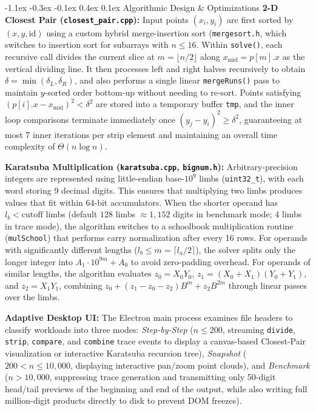 \documentclass[10pt,twocolumn]{article}
\makeatletter
\renewcommand\subsection{\@startsection{subsection}{2}{\z@}%
  {-1.1ex \@plus -0.3ex \@minus -0.1ex}%
  {0.4ex \@plus 0.1ex}%
  {\normalfont\small\bfseries}}
\makeatother
\begin{document}
\subsection{Algorithmic Design \& Optimizations}
\textbf{2-D Closest Pair (\texttt{closest\_pair.cpp}):} Input points $(x_i, y_i)$ are first sorted by $(x, y, \text{id})$ using a custom hybrid merge-insertion sort (\texttt{mergesort.h}, which switches to insertion sort for subarrays with $n \le 16$. Within \texttt{solve()}, each recursive call divides the current slice at $m = \lfloor n/2 \rfloor$ along $x_{\text{mid}} = p[m].x$ as the vertical dividing line. It then processes left and right halves recursively to obtain $\delta = \min(\delta_L, \delta_R)$, and also performs a single linear \texttt{mergeRuns()} pass to maintain $y$-sorted order bottom-up without needing to re-sort. Points satisfying $(p[i].x - x_{\text{mid}})^2 < \delta^2$ are stored into a temporary buffer \texttt{tmp}, and the inner loop comparisons terminate immediately once $(y_j - y_i)^2 \ge \delta^2$, guaranteeing at most 7 inner iterations per strip element and maintaining an overall time complexity of $\Theta(n \log n)$\cite{kleinberg2006algorithm}.

\textbf{Karatsuba Multiplication (\texttt{karatsuba.cpp}, \texttt{bignum.h}):} Arbitrary-precision integers are represented using little-endian base-$10^9$ limbs (\texttt{uint32\_t}), with each word storing 9 decimal digits. This ensures that multiplying two limbs produces values that fit within 64-bit accumulators. When the shorter operand has $l_b < \text{cutoff}$ limbs (default $128$ limbs $\approx 1{,}152$ digits in benchmark mode; $4$ limbs in trace mode), the algorithm switches to a schoolbook multiplication routine (\texttt{mulSchool}) that performs carry normalization after every 16 rows. For operands with significantly different lengths ($l_b \le m = \lceil l_a/2 \rceil$), the solver splits only the longer integer into $A_1 \cdot 10^{9m} + A_0$ to avoid zero-padding overhead. For operands of similar lengths, the algorithm evaluates $z_0 = X_0 Y_0$, $z_1 = (X_0+X_1)(Y_0+Y_1)$, and $z_2 = X_1 Y_1$, combining $z_0 + (z_1 - z_0 - z_2)B^m + z_2 B^{2m}$ through linear passes over the limbs.

\textbf{Adaptive Desktop UI:} The Electron main process examines file headers to classify workloads into three modes: \emph{Step-by-Step} ($n \le 200$, streaming \texttt{divide}, \texttt{strip}, \texttt{compare}, and \texttt{combine} trace events to display a canvas-based Closest-Pair visualization or interactive Karatsuba recursion tree), \emph{Snapshot} ($200 < n \le 10{,}000$, displaying interactive pan/zoom point clouds), and \emph{Benchmark} ($n > 10{,}000$, suppressing trace generation and transmitting only 50-digit head/tail previews of the beginning and end of the output, while also writing full million-digit products directly to disk to prevent DOM freezes).\newline
\end{document}
